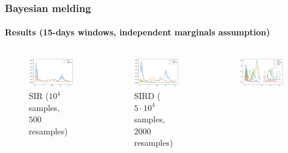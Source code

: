 \documentclass[aspectratio=43]{beamer}
\begin{document}
\begin{frame}
	\frametitle{Bayesian melding}
	\framesubtitle{Results (15-days windows, independent marginals assumption)}
	\begin{columns}
		\begin{figure}
			\includegraphics[width=\textwidth]{img/sir_meld_15.png}
			\caption{SIR ($10^4$ samples, $500$ resamples)}
		\end{figure}
		\begin{figure}
			\includegraphics[width=\textwidth]{img/sird_meld_15.png}
			\caption{SIRD ($5 \cdot 10^4$ samples, $2000$ resamples)}
		\end{figure}
		\begin{figure}
			\includegraphics[width=\textwidth]{img/seird_meld_15.png}

\end{figure}
\end{columns}
\end{frame}
\end{document}
